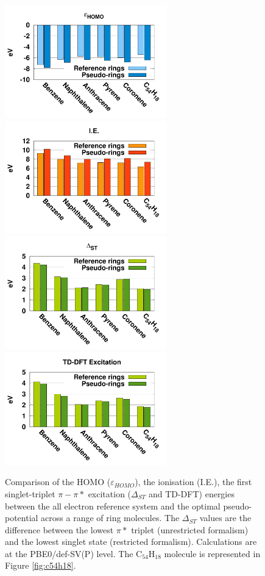 \documentclass[aip]{revtex4-1}
\begin{document}
\begin{figure}
\begin{center}
\includegraphics[width=7cm]{ring_pbe0_homo}
\includegraphics[width=7cm]{ring_pbe0_ie}
\includegraphics[width=7cm]{ring_pbe0_st}
\includegraphics[width=7cm]{ring_pbe0_tddft}
\end{center}
\caption{Comparison of the HOMO ($\varepsilon_{HOMO}$),
the ionisation (I.E.),
the first singlet-triplet $\pi-\pi*$ excitation ($\Delta_{ST}$ and TD-DFT) energies
between the
all electron reference system and the optimal pseudo-potential across a range of ring molecules.
The $\Delta_{ST}$ values are the difference
between the lowest $\pi*$ triplet (unrestricted formalism) and the lowest singlet state
(restricted formalism).
Calculations are at the PBE0/def-SV(P) level.
The C\(_{54}\)H\(_{18}\) molecule is represented in Figure \ref{fig:c54h18}.}
\label{fig:rings_graphs}
\end{figure}
\end{document}
